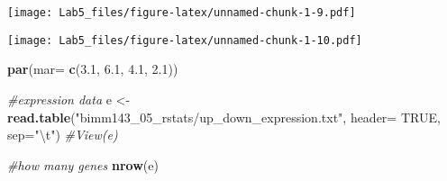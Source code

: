 \documentclass[]{article}
\newenvironment{Shaded}{\begin{snugshade}}{\end{snugshade}}
\newcommand{\KeywordTok}[1]{\textcolor[rgb]{0.13,0.29,0.53}{\textbf{#1}}}
\newcommand{\DataTypeTok}[1]{\textcolor[rgb]{0.13,0.29,0.53}{#1}}
\newcommand{\DecValTok}[1]{\textcolor[rgb]{0.00,0.00,0.81}{#1}}
\newcommand{\FloatTok}[1]{\textcolor[rgb]{0.00,0.00,0.81}{#1}}
\newcommand{\CharTok}[1]{\textcolor[rgb]{0.31,0.60,0.02}{#1}}
\newcommand{\StringTok}[1]{\textcolor[rgb]{0.31,0.60,0.02}{#1}}
\newcommand{\CommentTok}[1]{\textcolor[rgb]{0.56,0.35,0.01}{\textit{#1}}}
\newcommand{\OtherTok}[1]{\textcolor[rgb]{0.56,0.35,0.01}{#1}}
\newcommand{\OperatorTok}[1]{\textcolor[rgb]{0.81,0.36,0.00}{\textbf{#1}}}
\newcommand{\NormalTok}[1]{#1}
\begin{document}
\begin{Shaded}
\end{Shaded}

\texttt{[image: Lab5\_files/figure-latex/unnamed-chunk-1-9.pdf]}

\begin{Shaded}
\end{Shaded}

\texttt{[image: Lab5\_files/figure-latex/unnamed-chunk-1-10.pdf]}

\begin{Shaded}
\begin{Highlighting}[]
\KeywordTok{par}\NormalTok{(}\DataTypeTok{mar=} \KeywordTok{c}\NormalTok{(}\FloatTok{3.1}\NormalTok{, }\FloatTok{6.1}\NormalTok{, }\FloatTok{4.1}\NormalTok{, }\FloatTok{2.1}\NormalTok{))}

\CommentTok{#expression data}
\NormalTok{e <-}\StringTok{ }\KeywordTok{read.table}\NormalTok{(}\StringTok{"bimm143_05_rstats/up_down_expression.txt"}\NormalTok{, }\DataTypeTok{header=} \OtherTok{TRUE}\NormalTok{, }\DataTypeTok{sep=}\StringTok{"}\CharTok{\textbackslash{}t}\StringTok{"}\NormalTok{)}
\CommentTok{#View(e)}

 \CommentTok{#how many genes}
\KeywordTok{nrow}\NormalTok{(e)}
\end{Highlighting}
\end{Shaded}
\end{document}

